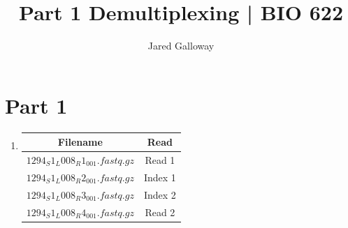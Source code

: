 \documentclass{article}
\title{Part 1 Demultiplexing | BIO 622}
\author{Jared Galloway}
\date{}                                           %
\begin{document}
\maketitle

\section*{Part 1}

\begin{enumerate}
 \item 

\begin{center}
 \begin{tabular}{||c c||} 
 \hline
 Filename & Read \\ [0.5ex] 
 \hline\hline
 $1294_S1_L008_R1_001.fastq.gz$ & Read 1 \\ 
 \hline
 $1294_S1_L008_R2_001.fastq.gz$ & Index 1 \\
 \hline
 $1294_S1_L008_R3_001.fastq.gz$ & Index 2 \\
 \hline
 $1294_S1_L008_R4_001.fastq.gz$ & Read 2 \\
 \hline
\end{tabular}
\end{center}

\end{enumerate}
\end{document}
